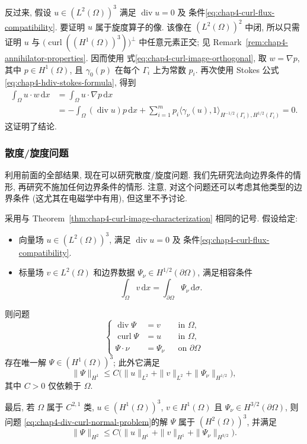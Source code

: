 \begin{Proof}
\begin{enumerate}
 反过来, 假设 $u\in(L^2(\Omega))^3$ 满足 $\operatorname{div}u=0$ 及
 条件\eqref{eq:chap4-curl-flux-compatibility}. 要证明 $u$ 属于旋度算子的像.
 该像在 $(L^2(\Omega))^2$ 中闭, 所以只需证明 $u$ 与
 $\bigl(\operatorname{curl}((H^1(\Omega))^3)\bigr)^\perp$ 中任意元素正交;
 见 Remark~\ref{rem:chap4-annihilator-properties}. 因而使用
 式\eqref{eq:chap4-curl-image-orthogonal}, 取 $w=\nabla p$, 其中
 $p\in H^1(\Omega)$, 且 $\gamma_0(p)$ 在每个 $\Gamma_i$ 上为常数 $p_i$.
 再次使用 Stokes 公式\eqref{eq:chap4-hdiv-stokes-formula}, 得到
 \[
 \begin{aligned}
  \int_\Omega u\cdot w\,\mathrm dx
  &=\int_\Omega u\cdot\nabla p\,\mathrm dx\\
  &=-\int_\Omega(\operatorname{div}u)p\,\mathrm dx
  +\sum_{i=1}^m p_i
  \langle\gamma_\nu(u),1\rangle_{H^{-1/2}(\Gamma_i),H^{1/2}(\Gamma_i)}=0.
 \end{aligned}
 \]
 这证明了结论.
\end{enumerate}
\end{Proof}

\subsubsection{散度/旋度问题}
\label{subsec:chap4-div-curl-problem}

利用前面的全部结果, 现在可以研究散度/旋度问题. 我们先研究法向边界条件的情形,
再研究不施加任何边界条件的情形. 注意, 对这个问题还可以考虑其他类型的边界条件
(这尤其在电磁学中有用), 但这里不予讨论.

\begin{Theorem}
\label{thm:chap4-div-curl-normal-boundary}
采用与 Theorem~\ref{thm:chap4-curl-image-characterization} 相同的记号. 假设给定:
\begin{itemize}
 \item 向量场 $u\in(L^2(\Omega))^3$, 满足 $\operatorname{div}u=0$ 及
 条件\eqref{eq:chap4-curl-flux-compatibility}.
 \item 标量场 $v\in L^2(\Omega)$ 和边界数据
 $\Psi_\nu\in H^{1/2}(\partial\Omega)$, 满足相容条件
 \[
  \int_\Omega v\,\mathrm dx=\int_{\partial\Omega}\Psi_\nu\,\mathrm d\sigma.
 \]
\end{itemize}
则问题
\begin{equation}
\left\{
\begin{aligned}
 \operatorname{div}\Psi&=v&&\text{in }\Omega,\\
 \operatorname{curl}\Psi&=u&&\text{in }\Omega,\\
 \Psi\cdot\nu&=\Psi_\nu&&\text{on }\partial\Omega
\end{aligned}
\right.
\label{eq:chap4-div-curl-normal-problem}
\end{equation}
存在唯一解 $\Psi\in(H^1(\Omega))^3$; 此外它满足
\[
 \|\Psi\|_{H^1}\leq C\bigl(
 \|u\|_{L^2}+\|v\|_{L^2}+\|\Psi_\nu\|_{H^{1/2}}\bigr),
\]
其中 $C>0$ 仅依赖于 $\Omega$.

最后, 若 $\Omega$ 属于 $C^{2,1}$ 类,
$u\in(H^1(\Omega))^3$, $v\in H^1(\Omega)$ 且
$\Psi_\nu\in H^{3/2}(\partial\Omega)$, 则问题
\eqref{eq:chap4-div-curl-normal-problem}的解 $\Psi$ 属于 $(H^2(\Omega))^3$, 并满足
\[
 \|\Psi\|_{H^2}\leq C\bigl(
 \|u\|_{H^1}+\|v\|_{H^1}+\|\Psi_\nu\|_{H^{3/2}}\bigr).
\]
\end{Theorem}

